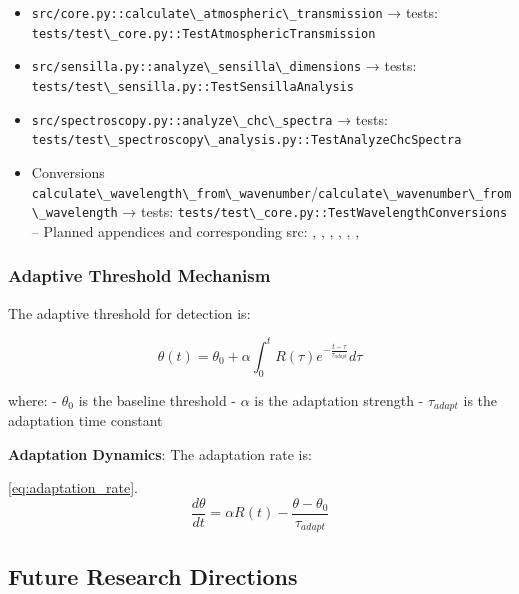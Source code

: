 \documentclass[
  13pt,
  a4paperpaper,
  12pt]{article}
\newcommand{\passthrough}[1]{#1}
\providecommand{\tightlist}{%
  \setlength{\itemsep}{0pt}\setlength{\parskip}{0pt}}
\begin{document}
\begin{itemize}
\tightlist
\item
  \passthrough{\lstinline!src/core.py::calculate\_atmospheric\_transmission!}
  → tests:
  \passthrough{\lstinline!tests/test\_core.py::TestAtmosphericTransmission!}
\item
  \passthrough{\lstinline!src/sensilla.py::analyze\_sensilla\_dimensions!}
  → tests:
  \passthrough{\lstinline!tests/test\_sensilla.py::TestSensillaAnalysis!}
\item
  \passthrough{\lstinline!src/spectroscopy.py::analyze\_chc\_spectra!} →
  tests:
  \passthrough{\lstinline!tests/test\_spectroscopy\_analysis.py::TestAnalyzeChcSpectra!}
\item
  Conversions
  \passthrough{\lstinline!calculate\_wavelength\_from\_wavenumber!}/\passthrough{\lstinline!calculate\_wavenumber\_from\_wavelength!}
  → tests:
  \passthrough{\lstinline!tests/test\_core.py::TestWavelengthConversions!}
  -- Planned appendices and corresponding src:
  , ,
  , ,
  , ,
\end{itemize}

\subsubsection{Adaptive Threshold
Mechanism}\label{adaptive-threshold-mechanism}

The adaptive threshold for detection is:

\begin{equation}
\theta(t) = \theta_0 + \alpha \int_0^t R(\tau) e^{-\frac{t-\tau}{\tau_{adapt}}} d\tau \label{eq:adaptive_threshold}
\end{equation}

where: - \(\theta_0\) is the baseline threshold - \(\alpha\) is the
adaptation strength - \(\tau_{adapt}\) is the adaptation time constant

\textbf{Adaptation Dynamics}: The adaptation rate is:

\eqref{eq:adaptation_rate}. \begin{equation}
\frac{d\theta}{dt} = \alpha R(t) - \frac{\theta - \theta_0}{\tau_{adapt}} \label{eq:adaptation_rate}
\end{equation}

\subsection{Future Research
Directions}\label{future-research-directions}
\end{document}
